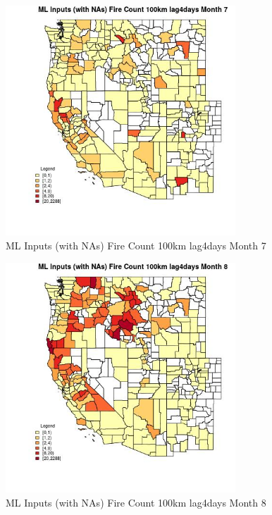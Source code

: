 \begin{figure} 
\centering  
\includegraphics[width=0.77\textwidth]{Code_Outputs/Report_ML_input_PM25_Step4_part_e_de_duplicated_aves_compiled_2019-05-20wNAs_CountyFire_Count_100km_lag4daysmedianMonth7.jpg} 
\caption{\label{fig:Report_ML_input_PM25_Step4_part_e_de_duplicated_aves_compiled_2019-05-20wNAsCountyFire_Count_100km_lag4daysmedianMonth7}ML Inputs (with NAs) Fire Count 100km lag4days Month 7} 
\end{figure} 
 

\begin{figure} 
\centering  
\includegraphics[width=0.77\textwidth]{Code_Outputs/Report_ML_input_PM25_Step4_part_e_de_duplicated_aves_compiled_2019-05-20wNAs_CountyFire_Count_100km_lag4daysmedianMonth8.jpg} 
\caption{\label{fig:Report_ML_input_PM25_Step4_part_e_de_duplicated_aves_compiled_2019-05-20wNAsCountyFire_Count_100km_lag4daysmedianMonth8}ML Inputs (with NAs) Fire Count 100km lag4days Month 8} 
\end{figure} 
 

